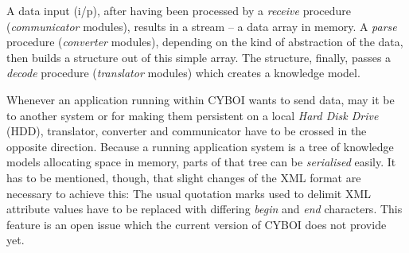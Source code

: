 A data input (i/p), after having been processed by a \emph{receive} procedure
(\emph{communicator} modules), results in a stream -- a data array in memory. A
\emph{parse} procedure (\emph{converter} modules), depending on the kind of
abstraction of the data, then builds a structure out of this simple array. The
structure, finally, passes a \emph{decode} procedure (\emph{translator}
modules) which creates a knowledge model.

Whenever an application running within CYBOI wants to send data, may it be to
another system or for making them persistent on a local \emph{Hard Disk Drive}
(HDD), translator, converter and communicator have to be crossed in the
opposite direction. Because a running application system is a tree of knowledge
models allocating space in memory, parts of that tree can be \emph{serialised}
easily. It has to be mentioned, though, that slight changes of the XML format
are necessary to achieve this: The usual quotation marks used to delimit XML
attribute values have to be replaced with differing \emph{begin} and \emph{end}
characters. This feature is an open issue which the current version of CYBOI
does not provide yet.

